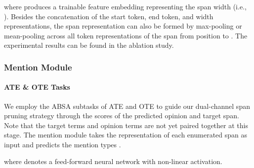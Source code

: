 \documentclass[11pt,a4paper]{article}
\begin{document}
where  produces a trainable feature embedding representing the span width (i.e., ).
Besides the concatenation of the start token, end token, and width representations,
the span representation  can also be formed by max-pooling or mean-pooling across all token representations of the span from position  to .  The experimental results can be found in the ablation study.




\subsubsection{Mention Module}
\label{mention_module}
\paragraph{ATE \& OTE Tasks}
We employ the ABSA subtasks of ATE and OTE to 
guide our dual-channel span pruning strategy through the scores of the predicted opinion and target span.
Note that the target terms and opinion terms are not yet paired together at this stage.  
The mention module takes the representation of each enumerated span   as input and predicts the mention types .

where  denotes a feed-forward neural network with non-linear activation.
\end{document}
